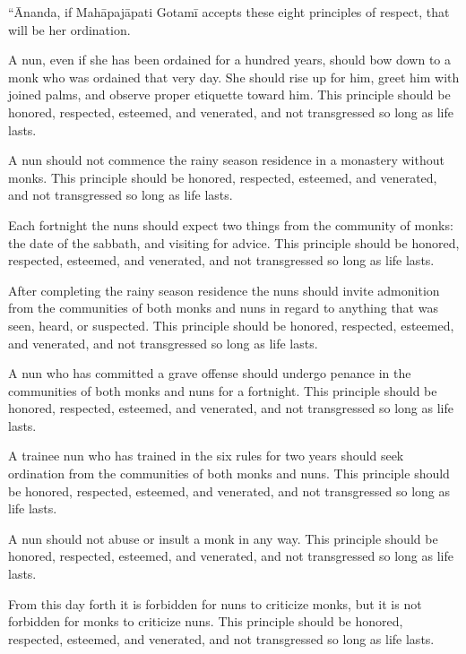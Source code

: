 \documentclass[12pt,openany]{book}%
\begin{document}
“Ānanda, if \textsanskrit{Mahāpajāpati} \textsanskrit{Gotamī} accepts these eight principles of respect, that will be her ordination. 

A nun, even if she has been ordained for a hundred years, should bow down to a monk who was ordained that very day. She should rise up for him, greet him with joined palms, and observe proper etiquette toward him. This principle should be honored, respected, esteemed, and venerated, and not transgressed so long as life lasts. 

A nun should not commence the rainy season residence in a monastery without monks. This principle should be honored, respected, esteemed, and venerated, and not transgressed so long as life lasts. 

Each fortnight the nuns should expect two things from the community of monks: the date of the sabbath, and visiting for advice. This principle should be honored, respected, esteemed, and venerated, and not transgressed so long as life lasts. 

After completing the rainy season residence the nuns should invite admonition from the communities of both monks and nuns in regard to anything that was seen, heard, or suspected. This principle should be honored, respected, esteemed, and venerated, and not transgressed so long as life lasts. 

A nun who has committed a grave offense should undergo penance in the communities of both monks and nuns for a fortnight. This principle should be honored, respected, esteemed, and venerated, and not transgressed so long as life lasts. 

A trainee nun who has trained in the six rules for two years should seek ordination from the communities of both monks and nuns. This principle should be honored, respected, esteemed, and venerated, and not transgressed so long as life lasts. 

A nun should not abuse or insult a monk in any way. This principle should be honored, respected, esteemed, and venerated, and not transgressed so long as life lasts. 

From this day forth it is forbidden for nuns to criticize monks, but it is not forbidden for monks to criticize nuns. This principle should be honored, respected, esteemed, and venerated, and not transgressed so long as life lasts. 
\end{document}
